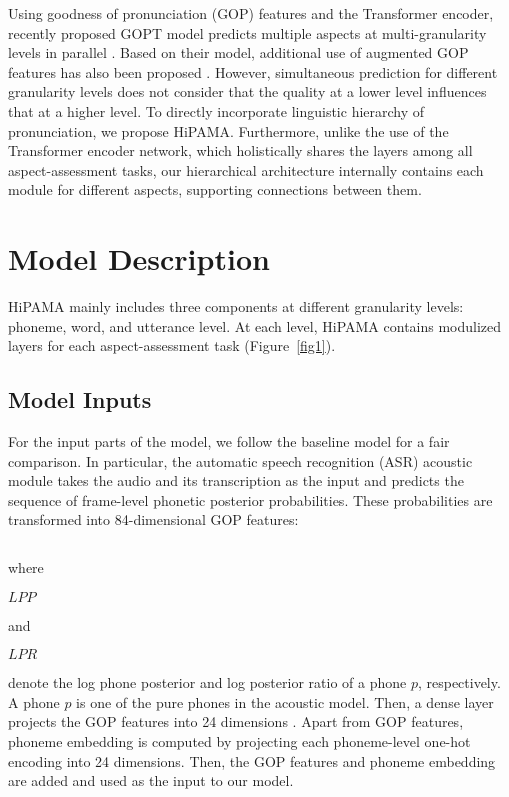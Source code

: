 \documentclass{article}
\begin{document}
Using goodness of pronunciation (GOP) \cite{witt2000phone} features and the Transformer \cite{vaswani2017attention} encoder, recently proposed GOPT model predicts multiple aspects at multi-granularity levels in parallel \cite{gong2022transformer}. Based on their model, additional use of augmented GOP features has also been proposed \cite{chao20223m}. However, simultaneous prediction for different granularity levels does not consider that the quality at a lower level influences that at a higher level. To directly incorporate linguistic hierarchy of pronunciation, we propose HiPAMA. Furthermore, unlike the use of the Transformer encoder network, which holistically shares the layers among all aspect-assessment tasks, our hierarchical architecture internally contains each module for different aspects, supporting connections between them.

\section{Model Description}
HiPAMA mainly includes three components at different granularity levels: phoneme, word, and utterance level. At each level, HiPAMA contains modulized layers for each aspect-assessment task (Figure~\ref{fig1}).

\subsection{Model Inputs}
For the input parts of the model, we follow the baseline model \cite{gong2022transformer} for a fair comparison. In particular, the automatic speech recognition (ASR) acoustic module takes the audio and its transcription as the input and predicts the sequence of frame-level phonetic posterior probabilities. These probabilities are transformed into 84-dimensional GOP features:
\begin{small}\begin{equation}
[LPP(p_1),\dots, LPP(p_{42}), LPR(p_1|p),\dots, LPR(p_{42}|p)]
\end{equation}\end{small}
where \begin{small}$LPP$\end{small} and \begin{small}$LPR$\end{small} denote the log phone posterior and log posterior ratio of a phone $p$, respectively. A phone $p$ is one of the pure phones in the acoustic model. Then, a dense layer projects the GOP features into 24 dimensions \cite{gong2022transformer}. Apart from GOP features, phoneme embedding is computed by projecting each phoneme-level one-hot encoding into 24 dimensions. Then, the GOP features and phoneme embedding are added and used as the input to our model.
\end{document}

